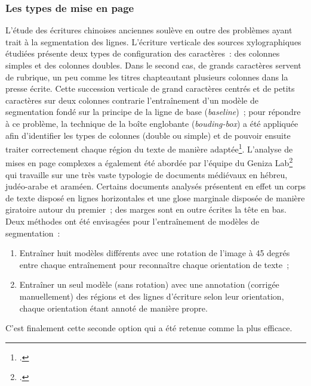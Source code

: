 \documentclass[a4paper,12pt,twoside]{book}
\begin{document}
				\subsubsection{Les types de mise en page}
				
				L'étude des écritures chinoises anciennes soulève en outre des problèmes
				ayant trait à la {segmentation} des lignes. L'écriture verticale des
				sources xylographiques étudiées présente deux types de configuration des
				caractères~: des colonnes simples et des colonnes doubles. Dans le
				second cas, de grands caractères servent de rubrique, un peu comme les
				titres chapteautant plusieurs colonnes dans la presse écrite. Cette
				succession verticale de grand caractères centrés et de petits caractères
				sur deux colonnes contrarie l'entraînement d'un modèle de {segmentation}
				fondé sur la principe de la ligne de base (\textit{baseline})~; pour
				répondre à ce problème, la technique de la boîte englobante
				(\textit{bouding-box}) a été appliquée afin d'identifier les types de
				colonnes (double ou simple) et de pouvoir ensuite traiter correctement
				chaque région du texte de manière adaptée\footcite{bizais-lilligExperimentationsPourAnalyse2022}. L'analyse de mises
				en page complexes a également été abordée par l'équipe du Geniza Lab\footcite{stoklbenezraSegmentationModeArchival2022} qui travaille sur une
				très vaste typologie de documents médiévaux en hébreu, judéo-arabe et
				araméen. Certains documents analysés présentent en effet un corps de
				texte disposé en lignes horizontales et une glose marginale disposée de
				manière giratoire autour du premier~; des marges sont en outre écrites
				la tête en bas. Deux méthodes ont été envisagées pour l'entraînement de
				modèles de {segmentation}~:
				
				\begin{enumerate}
					
					\item
					Entraîner huit modèles différents avec une rotation de l'image à 45
					degrés entre chaque entraînement pour reconnaître chaque orientation
					de texte~;
					\item
					Entraîner un seul modèle (sans rotation) avec une annotation (corrigée
					manuellement) des régions et des lignes d'écriture selon leur
					orientation, chaque orientation étant annoté de manière propre.
				\end{enumerate}
				
				C'est finalement cette seconde option qui a été retenue comme la plus
				efficace.
		
\end{document}
